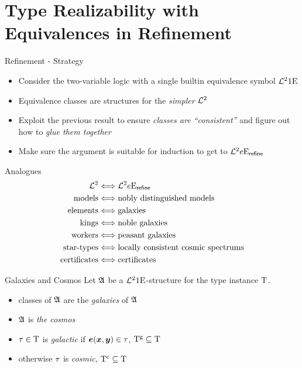 \documentclass{beamer}
\begin{document}
\section{Type Realizability with Equivalences in Refinement}
\begin{frame}{Refinement - Strategy}
\begin{itemize}
  \item Consider the two-variable logic with a single builtin equivalence symbol
  $\mathcal{L}^{2}{1}\mathrm{E}_{{}}$
  \item Equivalence classes are structures for the \emph{simpler} $\mathcal{L}^{2}$
  \item Exploit the previous result to ensure \emph{classes are ``consistent''} and
  figure out how to
  \emph{glue them together}
  \item Make sure the argument is suitable for induction to get to
  $\mathcal{L}^{2}{e}\mathrm{E}_{\mathsf{refine}}$
\end{itemize}
\end{frame}

\begin{frame}{Analogues}
\begin{align*}
  \mathcal{L}^{2} &\Longleftrightarrow \mathcal{L}^{2}{e}\mathrm{E}_{\mathsf{refine}} \\
  \text{models} &\Longleftrightarrow \text{nobly distinguished models} \\
  \text{elements} &\Longleftrightarrow \text{galaxies} \\
  \text{kings} &\Longleftrightarrow \text{noble galaxies} \\
  \text{workers} &\Longleftrightarrow \text{peasant galaxies} \\
  \text{star-types} &\Longleftrightarrow \text{locally consistent cosmic
  spectrums} \\
  \text{certificates} &\Longleftrightarrow \text{certificates}
\end{align*}
\end{frame}

\begin{frame}{Galaxies and Cosmos}
Let $\mathfrak{A}$ be a $\mathcal{L}^{2}{1}\mathrm{E}_{{}}$-structure for the type instance $\mathrm{T}$.
\begin{itemize}
  \item classes of $\mathfrak{A}$ are the \emph{galaxies} of $\mathfrak{A}$
  \item $\mathfrak{A}$ is \emph{the cosmos}
  \item $\tau\in\mathrm{T}$ is \emph{galactic} if $\bm{e}(\bm{x},\bm{y})\in\tau$,
  $\mathrm{T}^{\mathrm{g}}\subseteq\mathrm{T}$
  \item otherwise $\tau$ is \emph{cosmic}, $\mathrm{T}^{\mathrm{c}}\subseteq\mathrm{T}$
\end{itemize}
\end{frame}
\end{document}
